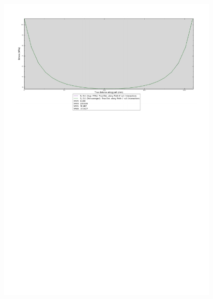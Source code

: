\begin{figure}[p]
{\includegraphics[width=\textwidth,trim=0 1.9cm 0 0,clip]{rel2/img2/GraficoMesh10.pdf}}
\end{figure}
